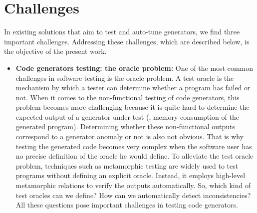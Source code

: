 \section{Challenges}
In existing solutions that aim to test and auto-tune generators, we find three important challenges. Addressing these challenges, which are described below, is the objective of the present work.
\begin{itemize}
\item
\textbf{Code generators testing: the oracle problem:} One of the most common challenges in software testing is the oracle problem. A test oracle is the mechanism by which a tester can determine whether a program has failed or not.
When it comes to the non-functional testing of code generators, this problem becomes more challenging because it is quite hard to determine the expected output of a generator under test (\eg, memory consumption of the generated program). Determining whether these non-functional outputs correspond to a generator anomaly or not is also not obvious. That is why testing the generated code becomes very complex when the software user has no precise definition of the oracle he would define. 
To alleviate the test oracle problem, techniques such as metamorphic testing\cite{chen1998metamorphic} are widely used to test programs without defining an explicit oracle. Instead, it employs high-level metamorphic relations to verify the outputs automatically.
So, which kind of test oracles can we define? How can we automatically detect inconsistencies? All these questions pose important challenges in testing code generators.



\end{itemize}
